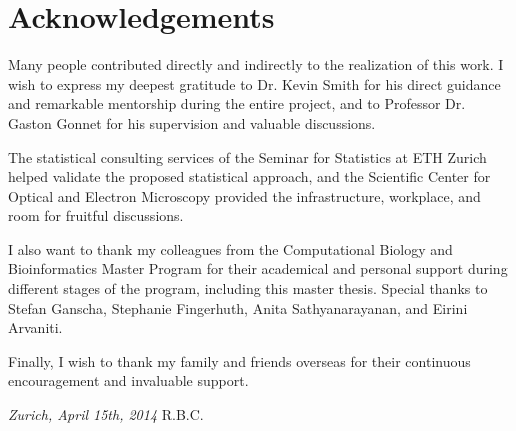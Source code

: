 \chapter*{Acknowledgements}

 Many people contributed directly and indirectly to the realization of this work. I wish to express my
 deepest gratitude to Dr. Kevin Smith for his direct guidance and remarkable mentorship during the entire project,
 and to Professor Dr. Gaston Gonnet for his supervision and valuable discussions.

\vskip0.2cm
 The statistical consulting services of the Seminar for Statistics at ETH Zurich helped validate
 the proposed statistical approach, and the Scientific Center for Optical and Electron Microscopy
 provided the infrastructure, workplace, and room for fruitful discussions.

\vskip0.2cm
 I also want to thank my colleagues from the Computational Biology and Bioinformatics Master Program 
 for their academical and personal support during different stages of the program, including
 this master thesis. Special thanks to Stefan Ganscha, Stephanie Fingerhuth, Anita Sathyanarayanan, and
 Eirini Arvaniti.

\vskip0.2cm
 Finally, I wish to thank my family and friends overseas for their continuous encouragement and
 invaluable support.

\bigskip
 
\noindent\textit{Zurich, April 15th, 2014}
\hfill R.B.C.

